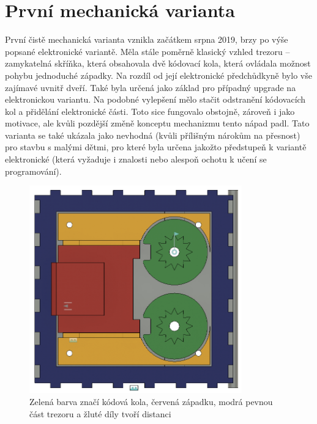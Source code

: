 \section{První mechanická varianta}

První čistě mechanická varianta vznikla začátkem srpna 2019, brzy po výše popsané elektronické variantě.
Měla stále poměrně klasický vzhled trezoru -- zamykatelná skříňka, která obsahovala dvě kódovací kola, která ovládala možnost pohybu jednoduché západky. %
Na rozdíl od její elektronické před\-chůd\-ky\-ně bylo vše zajímavé uvnitř dveří. Také byla určená jako základ pro případný upgrade na elektronickou
variantu. Na podobné vylepšení mělo stačit odstranění kódovacích kol a přidělání elektronické části. Toto sice fungovalo obstojně, zároveň 
i jako motivace, ale kvůli pozdější změně konceptu mechanizmu tento nápad padl.
Tato varianta se také ukázala jako nevhodná (kvůli přílišným nárokům na přesnost) pro stavbu s malými dětmi, pro které byla určena jakožto předstupeň 
k variantě elektronické (která vyžaduje i znalosti nebo alespoň ochotu k učení se programování).

\begin{figure}[htbp]
    \centering
    \includegraphics[width=260pt]{kapitoly/obrazky/M1/mechanizmus.png}
    \caption{Zelená barva značí kódová kola, červená západku, modrá pevnou část trezoru a žluté díly tvoří distanci}
    \label{fig:M1-mechanizmus}
\end{figure}
\newpage